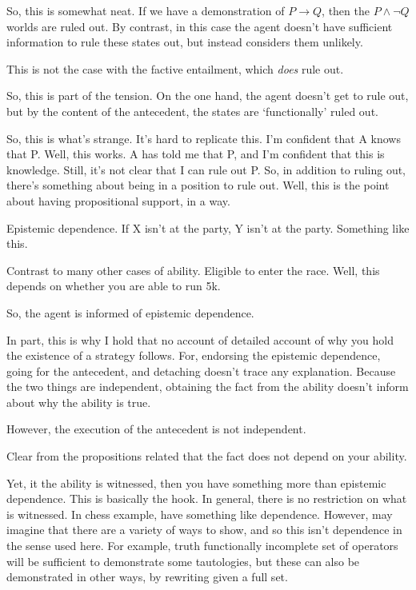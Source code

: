\documentclass[10pt]{article}
\begin{document}
So, this is somewhat neat.
If we have a demonstration of \(P \rightarrow Q\), then the \(P \land \lnot Q\) worlds are ruled out.
By contrast, in this case the agent doesn't have sufficient information to rule these states out, but instead considers them unlikely.

This is not the case with the factive entailment, which \emph{does} rule out.

So, this is part of the tension.
On the one hand, the agent doesn't get to rule out, but by the content of the antecedent, the states are `functionally' ruled out.

So, this is what's strange.
It's hard to replicate this.
I'm confident that A knows that P.
Well, this works.
A has told me that P, and I'm confident that this is knowledge.
Still, it's not clear that I can rule out P.
So, in addition to ruling out, there's something about being in a position to rule out.
Well, this is the point about having propositional support, in a way.


Epistemic dependence.
If X isn't at the party, Y isn't at the party.
Something like this.


Contrast to many other cases of ability.
Eligible to enter the race.
Well, this depends on whether you are able to run 5k.

So, the agent is informed of epistemic dependence.

In part, this is why I hold that no account of detailed account of why you hold the existence of a strategy follows.
For, endorsing the epistemic dependence, going for the antecedent, and detaching doesn't trace any explanation.
Because the two things are independent, obtaining the fact from the ability doesn't inform about why the ability is true.

However, the execution of the antecedent is not independent.

Clear from the propositions related that the fact does not depend on your ability.

Yet, it the ability is witnessed, then you have something more than epistemic dependence.
This is basically the hook.
In general, there is no restriction on what is witnessed.
In chess example, have something like dependence.
However, may imagine that there are a variety of ways to show, and so this isn't dependence in the sense used here.
For example, truth functionally incomplete set of operators will be sufficient to demonstrate some tautologies, but these can also be demonstrated in other ways, by rewriting given a full set.
\end{document}
